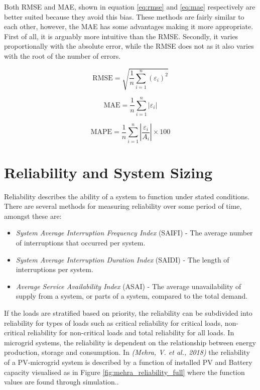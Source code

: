 Both RMSE and MAE, shown in equation \ref{eq:rmse} and \ref{eq:mae} respectively are better suited because they avoid this bias. These methods are fairly similar to each other, however, the MAE has some advantages making it more appropriate. First of all, it is arguably more intuitive than the RMSE. Secondly, it varies proportionally with the absolute error, while the RMSE does not as it also varies with the root of the number of errors\cite{Willmott2005-go}.

\begin{equation}
    \text{RMSE} = \sqrt{\frac{1}{n} \sum_{i=1}^{n} (\varepsilon_i)^2}
    \label{eq:rmse}
\end{equation}

\begin{equation}
    \text{MAE} = \frac{1}{n} \sum_{i=1}^{n} |\varepsilon_i|
    \label{eq:mae}
\end{equation}

\begin{equation}
    \text{MAPE} = \frac{1}{n} \sum_{i=1}^{n} \left|\frac{\varepsilon_i}{A_i}\right| \times 100
    \label{eq:mape}
\end{equation}




\section{Reliability and System Sizing}\label{sec:reliability}
Reliability describes the ability of a system to function under stated conditions. There are several methods for measuring reliability over some period of time, amongst these are:
\begin{itemize}
    \item \textit{System Average Interruption Frequency Index} (SAIFI)    -   The average number of interruptions that occurred per system.
    \item \textit{System Average Interruption Duration Index} (SAIDI)    -   The length of interruptions per system.
    \item \textit{Average Service Availability Index} (ASAI)    -   The average unavailability of supply from a system, or parts of a system, compared to the total demand. 
\end{itemize}

If the loads are stratified based on priority, the reliability can be subdivided into reliability for types of loads such as critical reliability for critical loads, non-critical reliability for non-critical loads and total reliability for all loads. In microgrid systems, the reliability is dependent on the relationship between energy production, storage and consumption. In \textit{(Mehra, V. et al., 2018)} the reliability of a PV-microgrid system is described by a function of installed PV and Battery capacity visualised as in Figure \ref{fig:mehra_reliability_full} where the function values are found through simulation.\cite{Mehra2018-xs}. 

